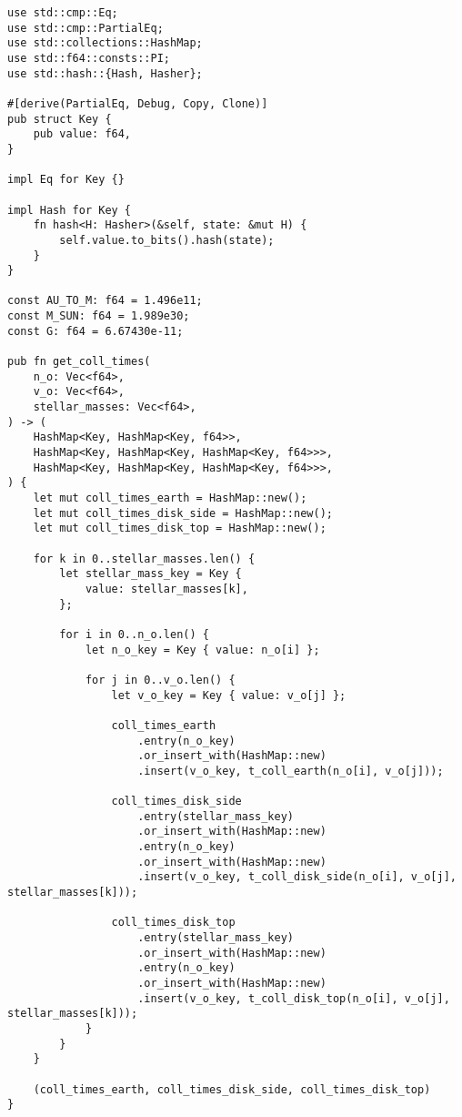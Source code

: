 \begin{lstlisting}
use std::cmp::Eq;
use std::cmp::PartialEq;
use std::collections::HashMap;
use std::f64::consts::PI;
use std::hash::{Hash, Hasher};

#[derive(PartialEq, Debug, Copy, Clone)]
pub struct Key {
    pub value: f64,
}

impl Eq for Key {}

impl Hash for Key {
    fn hash<H: Hasher>(&self, state: &mut H) {
        self.value.to_bits().hash(state);
    }
}

const AU_TO_M: f64 = 1.496e11;
const M_SUN: f64 = 1.989e30;
const G: f64 = 6.67430e-11;

pub fn get_coll_times(
    n_o: Vec<f64>,
    v_o: Vec<f64>,
    stellar_masses: Vec<f64>,
) -> (
    HashMap<Key, HashMap<Key, f64>>,
    HashMap<Key, HashMap<Key, HashMap<Key, f64>>>,
    HashMap<Key, HashMap<Key, HashMap<Key, f64>>>,
) {
    let mut coll_times_earth = HashMap::new();
    let mut coll_times_disk_side = HashMap::new();
    let mut coll_times_disk_top = HashMap::new();

    for k in 0..stellar_masses.len() {
        let stellar_mass_key = Key {
            value: stellar_masses[k],
        };

        for i in 0..n_o.len() {
            let n_o_key = Key { value: n_o[i] };

            for j in 0..v_o.len() {
                let v_o_key = Key { value: v_o[j] };

                coll_times_earth
                    .entry(n_o_key)
                    .or_insert_with(HashMap::new)
                    .insert(v_o_key, t_coll_earth(n_o[i], v_o[j]));

                coll_times_disk_side
                    .entry(stellar_mass_key)
                    .or_insert_with(HashMap::new)
                    .entry(n_o_key)
                    .or_insert_with(HashMap::new)
                    .insert(v_o_key, t_coll_disk_side(n_o[i], v_o[j], stellar_masses[k]));

                coll_times_disk_top
                    .entry(stellar_mass_key)
                    .or_insert_with(HashMap::new)
                    .entry(n_o_key)
                    .or_insert_with(HashMap::new)
                    .insert(v_o_key, t_coll_disk_top(n_o[i], v_o[j], stellar_masses[k]));
            }
        }
    }

    (coll_times_earth, coll_times_disk_side, coll_times_disk_top)
}


\end{lstlisting}
